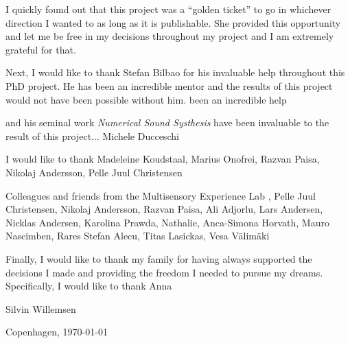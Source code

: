 I quickly found out that this project was a ``golden ticket'' to go in whichever direction I wanted to as long as it is publishable. She provided this opportunity and let me be free in my decisions throughout my project and I am extremely grateful for that.

Next, I would like to thank Stefan Bilbao for his invaluable help throughout this PhD project. He has been an incredible mentor and the results of this project would not have been possible without him.  been an incredible help


and his seminal work \textit{Numerical Sound Systhesis} have been invaluable to the result of this project...
Michele Ducceschi


I would like to thank Madeleine Koudstaal, Marius Onofrei, Razvan Paisa, Nikolaj Andersson, Pelle Juul Christensen

Colleagues and friends from the Multisensory Experience Lab
, Pelle Juul Christensen, Nikolaj Andersson, Razvan Paisa, Ali Adjorlu, Lars Andersen, Nicklas Andersen, Karolina Prawda, Nathalie, Anca-Simona Horvath, Mauro Nascimben, Rares Stefan Alecu, Titas Lasickas, Vesa V{\"a}lim{\"a}ki


Finally, I would like to thank my family for having always supported the decisions I made and providing the freedom I needed to pursue my dreams. Specifically, I would like to thank Anna


\vfill
\hfill Silvin Willemsen

\hfill Copenhagen, \today
